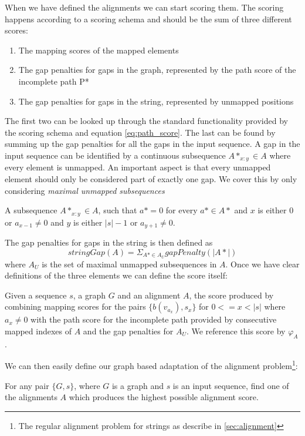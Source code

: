 \documentclass[thesis.tex]{subfiles}
\begin{document}
{When we have defined the alignments we can start scoring them. The scoring happens according to a scoring schema and should be the sum of three different scores:
\begin{enumerate}
  \item The mapping scores of the mapped elements
  \item The gap penalties for gaps in the graph, represented by the path score of the incomplete path P*
  \item The gap penalties for gaps in the string, represented by unmapped positions
\end{enumerate}
The first two can be looked up through the standard functionality provided by the scoring schema and equation \ref{eq:path_score}. The last can be found by summing up the gap penalties for all the gaps in the input sequence. A gap in the input sequence can be identified by a continuous subsequence $A*_{x:y} \in A$ where every element is unmapped. An important aspect is that every unmapped element should only be considered part of exactly one gap. We cover this by only considering \textit{maximal unmapped subsequences}
\begin{defn}
  A subsequence $A*_{x:y} \in A$, such that $a*=0$ for every $a* \in A*$ and $x$ is either $0$ or $a_{x-1} \neq 0$ and $y$ is either $|s|-1$ or $a_{y+1} \neq 0$.
\end{defn}
The gap penalties for gaps in the string is then defined as 
\begin{equation}
  stringGap(A)=\Sigma_{A* \in A_U} gapPenalty(|A*|)
\end{equation}
where $A_U$ is the set of maximal unmapped subsequences in $A$. Once we have clear definitions of the three elements we can define the score itself:
\begin{defn}
  Given a sequence $s$, a graph $G$ and an alignment $A$, the score produced by combining mapping scores for the pairs $\{b(v_{a_x}), s_x\}$ for $0<=x<|s|$ where $a_x \neq 0$ with the path score for the incomplete path provided by consecutive mapped indexes of $A$ and the gap penalties for $A_U$. We reference this score by $\varphi_A$.
\end{defn}
We can then easily define our graph based adaptation of the alignment problem\footnote{The regular alignment problem for strings as describe in \ref{sec:alignment}}:
\begin{defn}
  For any pair $\{G, s\}$, where $G$ is a graph and $s$ is an input sequence, find one of the alignments $A$ which produces the highest possible alignment score.

\end{defn}}
\end{document}
